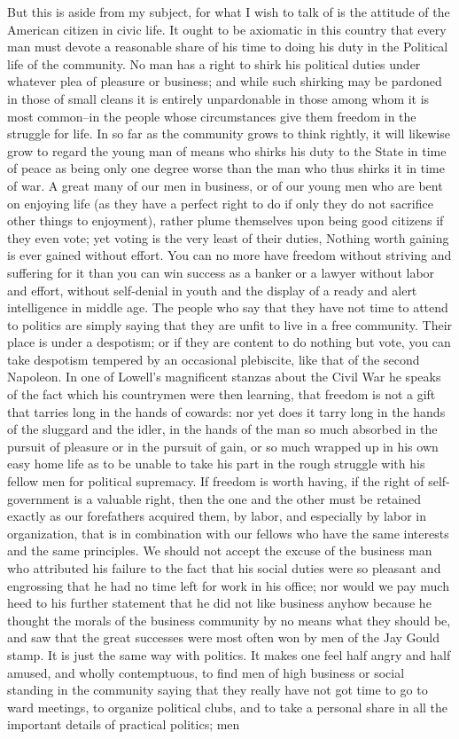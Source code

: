 \documentclass[a4paper]{amsbook}
\begin{document}
But this is aside from my subject, for what I wish to talk of is the attitude of the American citizen in civic life. It ought to be axiomatic in this country that every man must devote a reasonable share of his time to doing his duty in the Political life of the community. No man has a right to shirk his political duties under whatever plea of pleasure or business; and while such shirking may be pardoned in those of small cleans it is entirely unpardonable in those among whom it is most common–in the people whose circumstances give them freedom in the struggle for life. In so far as the community grows to think rightly, it will likewise grow to regard the young man of means who shirks his duty to the State in time of peace as being only one degree worse than the man who thus shirks it in time of war. A great many of our men in business, or of our young men who are bent on enjoying life (as they have a perfect right to do if only they do not sacrifice other things to enjoyment), rather plume themselves upon being good citizens if they even vote; yet voting is the very least of their duties, Nothing worth gaining is ever gained without effort. You can no more have freedom without striving and suffering for it than you can win success as a banker or a lawyer without labor and effort, without self-denial in youth and the display of a ready and alert intelligence in middle age. The people who say that they have not time to attend to politics are simply saying that they are unfit to live in a free community. Their place is under a despotism; or if they are content to do nothing but vote, you can take despotism tempered by an occasional plebiscite, like that of the second Napoleon. In one of Lowell's magnificent stanzas about the Civil War he speaks of the fact which his countrymen were then learning, that freedom is not a gift that tarries long in the hands of cowards: nor yet does it tarry long in the hands of the sluggard and the idler, in the hands of the man so much absorbed in the pursuit of pleasure or in the pursuit of gain, or so much wrapped up in his own easy home life as to be unable to take his part in the rough struggle with his fellow men for political supremacy. If freedom is worth having, if the right of self-government is a valuable right, then the one and the other must be retained exactly as our forefathers acquired them, by labor, and especially by labor in organization, that is in combination with our fellows who have the same interests and the same principles. We should not accept the excuse of the business man who attributed his failure to the fact that his social duties were so pleasant and engrossing that he had no time left for work in his office; nor would we pay much heed to his further statement that he did not like business anyhow because he thought the morals of the business community by no means what they should be, and saw that the great successes were most often won by men of the Jay Gould stamp. It is just the same way with politics. It makes one feel half angry and half amused, and wholly contemptuous, to find men of high business or social standing in the community saying that they really have not got time to go to ward meetings, to organize political clubs, and to take a personal share in all the important details of practical politics; men 
\end{document}
